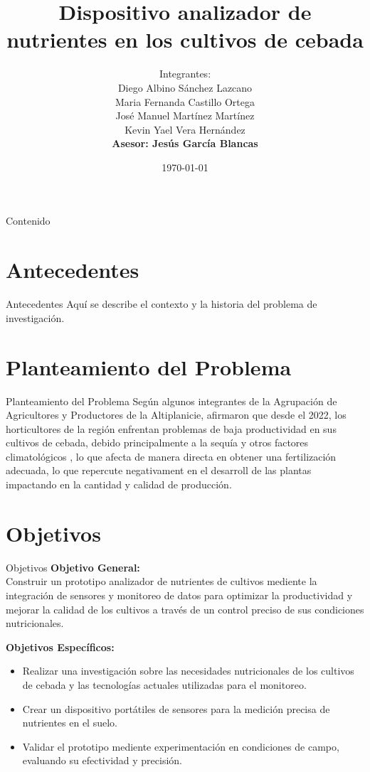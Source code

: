 \documentclass{beamer}
\title[Nombre del Proyecto]{\textbf{Dispositivo analizador de nutrientes en los cultivos de cebada}}
\author[Autores]{ Integrantes: \\Diego Albino Sánchez Lazcano \\ Maria Fernanda Castillo Ortega \\ José Manuel Martínez Martínez \\ Kevin Yael Vera Hernández\\
\textbf{Asesor: Jesús García Blancas}}
\institute[Institución]{\includegraphics[width=0.2\textwidth]
\textbf{Instituto Tecnológico Superior del Oriente del Estado de Hidalgo} \\
\textbf{Ingeniería Mecatrónica}}
\date{\today}
\begin{document}
\begin{frame}
    \titlepage
    
\end{frame}

\begin{frame}{Contenido}
    \tableofcontents
\end{frame}

\section{Antecedentes}
\begin{frame}{Antecedentes}
    Aquí se describe el contexto y la historia del problema de investigación.
\end{frame}

\section{Planteamiento del Problema}
\begin{frame}{Planteamiento del Problema}
    Según algunos integrantes de la Agrupación de Agricultores y Productores de la Altiplanicie, afirmaron que desde el 2022, los horticultores de la región enfrentan problemas de baja productividad en sus cultivos de cebada, debido principalmente a la sequía y otros factores climatológicos , lo que afecta de manera directa en obtener una fertilización adecuada, lo que repercute negativament en el desarroll de las plantas impactando en la cantidad y calidad de producción.
\end{frame}

\section{Objetivos}
\begin{frame}{Objetivos}
    \textbf{Objetivo General:} \\ Construir un prototipo analizador de nutrientes de cultivos mediente la integración de sensores y monitoreo de datos para optimizar la productividad y mejorar la calidad de los cultivos a través de un control preciso de sus condiciones nutricionales.
    \vspace{0.5cm}

    \textbf{Objetivos Específicos:}
    \begin{itemize}
        \item Realizar una investigación sobre las necesidades nutricionales de los cultivos de cebada y las tecnologías actuales utilizadas para el monitoreo. 
        \item Crear un dispositivo portátiles de sensores para la medición precisa de nutrientes en el suelo. 
        \item Validar el prototipo mediente experimentación en condiciones de campo, evaluando su efectividad y precisión.
    \end{itemize}
\end{frame}
\end{document}
